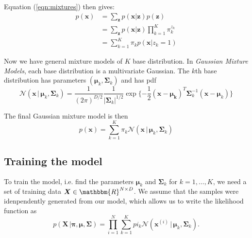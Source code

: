 \documentclass[final,3p,times]{elsarticle}
\begin{document}
Equation (\ref{eqn:mixtures}) then gives:
\begin{equation}
\begin{split}
p(\boldsymbol{x}) & = \sum_{\boldsymbol{z}} p(\boldsymbol{x}|\boldsymbol{z})p(\boldsymbol{z}) \\
& = \sum_{\boldsymbol{z}} p(\boldsymbol{x}|\boldsymbol{z}) \prod_{k=1}^K \pi_k^{z_k} \\
& = \sum_{k = 1}^K \pi_k p(\boldsymbol{x}|z_k = 1)
\end{split}
\end{equation}

Now we have general mixture models of $K$ base distribution. In \emph{Gaussian Mixture Models}, each base distribution is a multivariate Gaussian. The $k$th base distribution has parameters $(\boldsymbol{\mu}_k, \boldsymbol{\Sigma}_k)$ and has pdf
\begin{equation}
\label{eqn:MVG}
\mathcal{N}(\boldsymbol{x}\,|\,\boldsymbol{\mu}_k, \boldsymbol{\Sigma}_k) = \frac{1}{(2\pi)^{D/2}}\frac{1}{|\boldsymbol{\Sigma}_k|^{1/2}}
\exp{\{-\frac{1}{2}(\boldsymbol{x}-\boldsymbol{\mu_k})^T \boldsymbol{\Sigma}_k^{-1}(\boldsymbol{x}-\boldsymbol{\mu}_k) \}}
\end{equation}

The final Gaussian mixture model is then
\begin{equation}
\label{eqn:GMM}
p(\boldsymbol{x}) = \sum_{k = 1}^K \pi_k \mathcal{N}(\boldsymbol{x}\,|\,\boldsymbol{\mu}_k, \boldsymbol{\Sigma}_k)
\end{equation}

\subsection*{Training the model}
\label{sect:GMM-train}
To train the model, i.e. find the parameters $\boldsymbol{\mu}_k$ and $\boldsymbol{\Sigma}_k$ for $ k = 1,\dots, K$, we need a set of training data $\boldsymbol{X} \in \mathbbm{R}^{N\times D}$. We assume that the samples were idenpendently generated from our model, which allows us to write the likelihood function as
\begin{equation}
\label{eqn:GMM-likelihood}
p(\boldsymbol{X}\,|\boldsymbol{\pi},\boldsymbol{\mu},\boldsymbol{\Sigma}) = \prod_{i=1}^N\sum_{k=1}^K pi_k
 \mathcal{N}(\boldsymbol{x}^{(i)}\,|\,\boldsymbol{\mu}_k, \boldsymbol{\Sigma}_k).
\end{equation}
\end{document}
